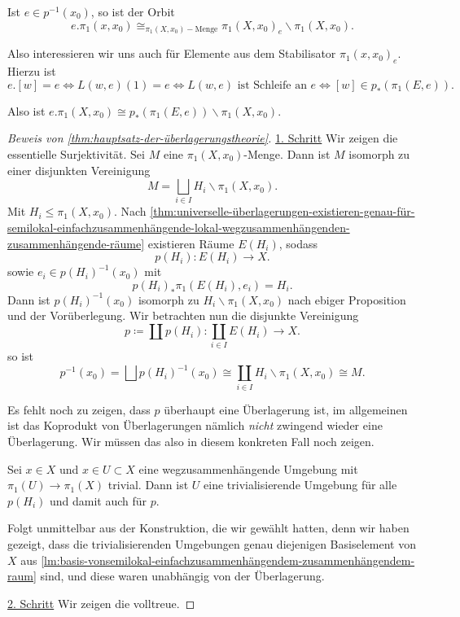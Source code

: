 Ist $e\in p^{-1} (x_0)$, so ist der Orbit
\[
    e.\pi_1(x,x_0) \cong_{\pi_1(X,x_0)-\text{Menge}} \pi_1(X,x_0)_e \backslash \pi_1(X,x_0)
.\] 

Also interessieren wir uns auch für Elemente aus dem Stabilisator $\pi_1(x,x_0)_e$. Hierzu ist
\[
    e.[w] = e \iff  L(w,e)(1) = e \iff  L(w,e) \text{ ist Schleife an } e \iff  [w] \in  p_*(\pi_1(E,e))
.\] 

Also ist $e.\pi_1(X,x_0) \cong p_*(\pi_1(E,e)) \backslash \pi_1(X,x_0)$.

\begin{proof}[Beweis von \autoref{thm:hauptsatz-der-überlagerungstheorie}]
    \underline{1. Schritt} Wir zeigen die essentielle Surjektivität. Sei $M$ eine  $\pi_1(X,x_0)$-Menge. Dann ist $M$ isomorph zu einer disjunkten Vereinigung
    \[
        M = \bigsqcup_{i\in I} H_i \backslash \pi_1(X,x_0)
    .\] 
    Mit $H_i \leq  \pi_1(X,x_0)$. Nach \autoref{thm:universelle-überlagerungen-existieren-genau-für-semilokal-einfachzusammenhängende-lokal-wegzusammenhängenden-zusammenhängende-räume} existieren Räume $E(H_i)$, sodass
     \[
         p(H_i) \colon  E(H_i) \to  X
    .\] 
    sowie $e_i\in p(H_i)^{-1}(x_0)$ mit 
    \[
        p(H_i)_* \pi_1(E(H_i),e_i) = H_i
    .\] 
    Dann ist $p(H_i)^{-1}(x_0)$ isomorph zu $H_i \backslash \pi_1(X,x_0)$ nach ebiger Proposition und der Vorüberlegung. Wir betrachten nun die disjunkte Vereinigung
    \[
        p\coloneqq  \coprod p(H_i) \colon  \coprod _{i \in I} E(H_i) \to  X
    .\] 
    so ist
    \[
        p^{-1} (x_0) = \bigsqcup p(H_i)^{-1}(x_0) \cong \coprod_{i \in I} H_i \backslash \pi_1(X,x_0) \cong M
    .\] 
    \begin{remark}
        Es fehlt noch zu zeigen, dass $p$ überhaupt eine Überlagerung ist, im allgemeinen ist das Koprodukt von Überlagerungen nämlich \textit{nicht} zwingend wieder eine Überlagerung. Wir müssen das also in diesem konkreten Fall noch zeigen.
    \end{remark}
    \begin{claim}
        Sei $x\in X$ und $x\in U\subset X$ eine wegzusammenhängende Umgebung mit $\pi_1(U) \to  \pi_1(X)$ trivial. Dann ist $U$ eine trivialisierende Umgebung für alle  $p(H_i)$ und damit auch für  $p$.
    \end{claim}
    \begin{subproof}
        Folgt unmittelbar aus der Konstruktion, die wir gewählt hatten, denn wir haben gezeigt, dass die trivialisierenden Umgebungen genau diejenigen Basiselement von $X$ aus  \autoref{lm:basis-vonsemilokal-einfachzusammenhängendem-zusammenhängendem-raum} sind, und diese waren unabhängig von der Überlagerung.
    \end{subproof}
    \underline{2. Schritt} Wir zeigen die volltreue.


\end{proof}
